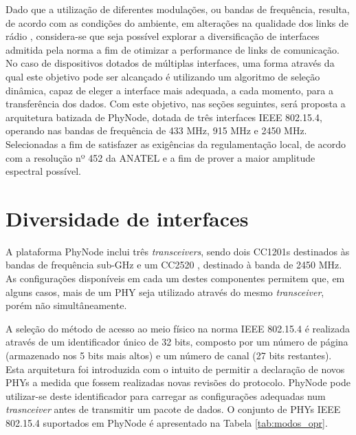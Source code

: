 \documentclass{article}
\begin{document}
	Dado que a utilização de diferentes modulações, ou bandas de frequência, resulta, de acordo com as condições do ambiente, em alterações na qualidade dos links de rádio \cite{bibid}, considera-se que seja possível explorar a diversificação de interfaces admitida pela norma a fim de otimizar a performance de links de comunicação. No caso de dispositivos dotados de múltiplas interfaces, uma forma através da qual este objetivo pode ser alcançado é utilizando um algoritmo de seleção dinâmica, capaz de eleger a interface mais adequada, a cada momento, para a transferência dos dados. Com este objetivo, nas seções seguintes, será proposta a arquitetura batizada de PhyNode, dotada de três interfaces IEEE 802.15.4, operando nas bandas de frequência de 433 MHz, 915 MHz e 2450 MHz. Selecionadas a fim de satisfazer as exigências da regulamentação local, de acordo com a resolução nº 452 da ANATEL \cite{bibid} e a fim de prover a maior amplitude espectral possível.

\section{Diversidade de interfaces}	
	A plataforma PhyNode inclui três \textit{transceivers}, sendo dois CC1201s \cite{bibid} destinados às bandas de frequência sub-GHz e um CC2520 \cite{bibid}, destinado à banda de 2450 MHz. As configurações disponíveis em cada um destes componentes permitem que, em alguns casos, mais de um PHY seja utilizado através do mesmo \textit{transceiver}, porém  não simultâneamente.
	
	A seleção do método de acesso ao meio físico na norma IEEE 802.15.4 é realizada através de um identificador único de 32 bits, composto por um número de página (armazenado nos 5 bits mais altos) e um número de canal (27 bits restantes). Esta arquitetura foi introduzida com o intuito de permitir a declaração de novos PHYs a medida que fossem realizadas novas revisões do protocolo. PhyNode pode utilizar-se deste identificador para carregar as configurações adequadas num \textit{trasnceiver} antes de transmitir um pacote de dados. O conjunto de PHYs IEEE 802.15.4 suportados em PhyNode é apresentado na Tabela \ref{tab:modos_opr}.
	
\end{document}
